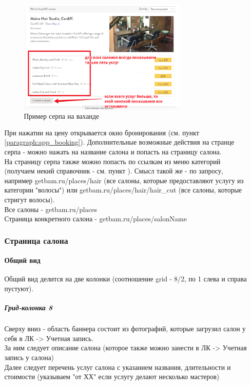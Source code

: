 \documentclass[DIV=calc, paper=a4, fontsize=11pt]{scrartcl} %
\begin{document}
	 \begin{figure}[H]
        \centering
        \includegraphics[width=320px]{serp1.png}
        \caption{Пример серпа на ваханде\label{fig:serp.png}}
        \end{figure}
        
При нажатии на цену открывается окно бронирования (см. пункт \ref{paragraph:app_booking}).
Дополнительные возможные действия на странце серпа - можно нажать на название салона и попасть на страницу салона.
\\[0.5cm]
На страницу серпа также можно попасть по ссылкам из меню категорий (получаем некий справочник - см. пункт \label{subparagraph:categories}). Смысл такой же - по запросу, например getbam.ru/places/hair (все салоны, которые предоставляют услугу из категории "волосы") или getbam.ru/places/hair/hair_cut (все салоны, которые стригут волосы).
\\[0.5cm]
Все салоны - getbam.ru/places
\\Страница конкретного салона - getbam.ru/places/salonName

\subsubsection{Страница салона}

\paragraph{Общий вид}

Общий вид делится на две колонки (соотношение grid - 8/2, по 1 слева и справа пустуют).
\subparagraph{Грид-колонка 8}
Сверху вниз - область баннера состоит из фотографий, которые загрузил салон у себя в ЛК -> Учетная запись.
\\[0.5cm]
За ним следует описание салона (которое также можно занести в ЛК -> Учетная запись у салона)
\\[0.5cm]
Далее следует перечень услуг салона с указанием названия, длительности и стоимости (указываем "от ХХ" если услугу делают несколько мастеров)
\end{document}
